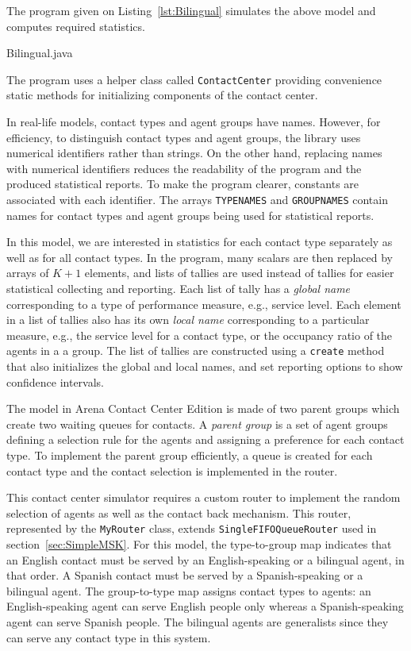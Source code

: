 The program given on Listing~\ref{lst:Bilingual} simulates the above
model and computes required statistics.


{Bilingual.java}

The program uses a helper class called
\texttt{Contact\-Center} providing convenience static methods for
initializing components of the contact center.

In real-life models, contact types and agent groups have names.
However, for efficiency, to distinguish contact types and agent
groups, the library uses numerical identifiers rather than strings.
On the other hand, replacing names with numerical identifiers reduces the
readability of the program and the produced statistical reports.
To make the program clearer, constants are associated
with each identifier.  The arrays \texttt{TYPENAMES} and
\texttt{GROUPNAMES} contain names for contact types and agent groups
being used for statistical reports.

In this model, we are interested in statistics for each contact type
separately as well as for all contact types.  In the program, many
scalars are then replaced by arrays of $K+1$ elements, and lists of
tallies are used instead of tallies for easier statistical collecting
and reporting.
Each list of tally has a \emph{global name} corresponding to a type of
performance measure, e.g., service level.  Each element in a list of
tallies also has its own
\emph{local name} corresponding to a particular measure, e.g., the service
level for a contact type, or the occupancy ratio of the agents in a a group.
The list of tallies are constructed using a \texttt{create} method
that also initializes the global and local names, and set
reporting options to show confidence intervals.

The model in Arena Contact Center Edition
is made of two parent groups which create two waiting
queues for contacts.  A \emph{parent group} is a set of agent groups
defining
a selection rule for the agents and assigning a preference for each
contact type.  To implement the parent group efficiently, a
queue is created for each contact type and the contact selection is
implemented in the router.

This contact center simulator requires a custom router to implement the
random selection of agents as well as the contact back mechanism.  This
router, represented by the \texttt{My\-Router} class,
extends \texttt{Single\-FIFO\-Queue\-Router} used in
section~\ref{sec:SimpleMSK}.   For this model, the type-to-group map
indicates that an English contact must be served by an English-speaking
or a bilingual agent, in that order.  A Spanish contact must be
served by a
Spanish-speaking or a bilingual agent.  The group-to-type map assigns
contact types to agents:  an English-speaking agent can serve English
people only whereas a Spanish-speaking agent can serve Spanish people.
The bilingual agents are generalists since they can serve any contact
type in this system.

